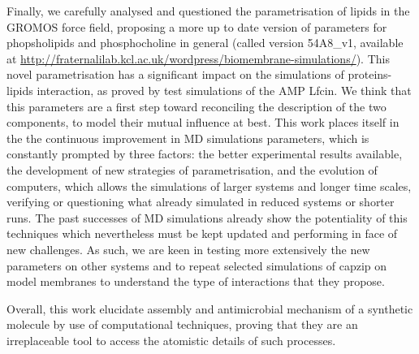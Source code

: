 Finally, we carefully analysed and questioned the parametrisation of lipids in the GROMOS force field, proposing a more up to date version of parameters for phopsholipids and phosphocholine in general (called version 54A8\_v1, available at \url{http://fraternalilab.kcl.ac.uk/wordpress/biomembrane-simulations/}). This novel parametrisation has a significant impact on the simulations of proteins-lipids interaction, as proved by test simulations of the AMP Lfcin. We think that this parameters are a first step toward reconciling the description of the two components, to model their mutual influence at best.
%
This work places itself in the the continuous improvement in MD simulations parameters, which is constantly prompted by three factors: the better experimental results available, the development of new strategies of parametrisation, and the evolution of computers, which allows the simulations of larger systems and longer time scales, verifying or questioning what already simulated in reduced systems or shorter runs.
%
The past successes of MD simulations already show the potentiality of this techniques which nevertheless must be kept updated and performing in face of new challenges.
As such, we are keen in testing more extensively the new parameters on other systems and to repeat selected simulations of capzip on model membranes to understand the type of interactions that they propose.

Overall, this work elucidate assembly and antimicrobial mechanism of a synthetic molecule by use of computational techniques, proving that they are an irreplaceable tool to access the atomistic details of such processes.

